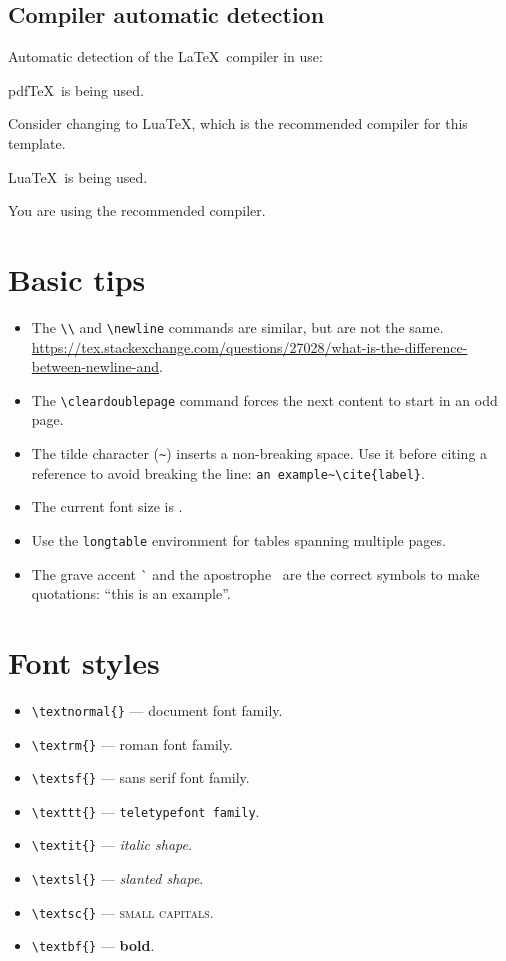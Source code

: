 \subsection{Compiler automatic detection}

Automatic detection of the \LaTeX\ compiler in use:

\ifPDFTeX
{\color{red} pdf\TeX\ is being used.}

Consider changing to Lua\TeX, which is the recommended compiler for this template.
\fi

\ifLuaTeX
{\color{Green4} Lua\TeX\ is being used.}

You are using the recommended compiler.
\fi


\section{Basic tips}
\label{c2:s:basic-tips}

\begin{itemize}
\item
The \verb+\\+ and \verb+\newline+ commands are similar, but are not the same.\\
\url{https://tex.stackexchange.com/questions/27028/what-is-the-difference-between-newline-and}.
\item
The \verb+\cleardoublepage+ command forces the next content to start in an odd page.
\item
The tilde character (\verb+~+) inserts a non-breaking space.
Use it before citing a reference to avoid breaking the line: \verb+an example~\cite{label}+.
\item
The current font size is \myfontsize.
\item
Use the \verb+longtable+ environment for tables spanning multiple pages.
\item
The grave accent \`{} and the apostrophe \textquotesingle\ are the correct symbols to make quotations: ``this is an example''.
\end{itemize}


\section{Font styles}
\label{c2:s:font-styles}

\begin{itemize}
\item
\verb+\textnormal{}+ --- \textnormal{document font family}.
\item
\verb+\textrm{}+ --- \textrm{roman font family}.
\item
\verb+\textsf{}+ --- \textsf{sans serif font family}.
\item
\verb+\texttt{}+ --- \texttt{teletypefont family}.
\item
\verb+\textit{}+ --- \textit{italic shape}.
\item
\verb+\textsl{}+ --- \textsl{slanted shape}.
\item
\verb+\textsc{}+ --- \textsc{small capitals}.
\item
\verb+\textbf{}+ --- \textbf{bold}.
\end{itemize}


